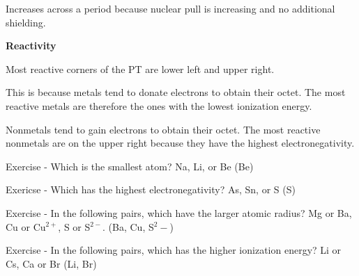 \documentclass[../hchem.tex]{subfiles}
\begin{document}
Increases across a period because nuclear pull is increasing and no additional shielding.

\textbf{Reactivity}

Most reactive corners of the PT are lower left and upper right.

This is because metals tend to donate electrons to obtain their octet. The most reactive metals are therefore the ones with the lowest ionization energy.

Nonmetals tend to gain electrons to obtain their octet. The most reactive nonmetals are on the upper right because they have the highest electronegativity.

Exercise - Which is the smallest atom? Na, Li, or Be (Be)

Exericse - Which has the highest electronegativity? As, Sn, or S (S)

Exercise - In the following pairs, which have the larger atomic radius? Mg or Ba, Cu or Cu$^{2+}$, S or S$^{2-}$. (Ba, Cu, S$^2-$)

Exercise - In the following pairs, which has the higher ionization energy? Li or Cs, Ca or Br (Li, Br)
\end{document}
